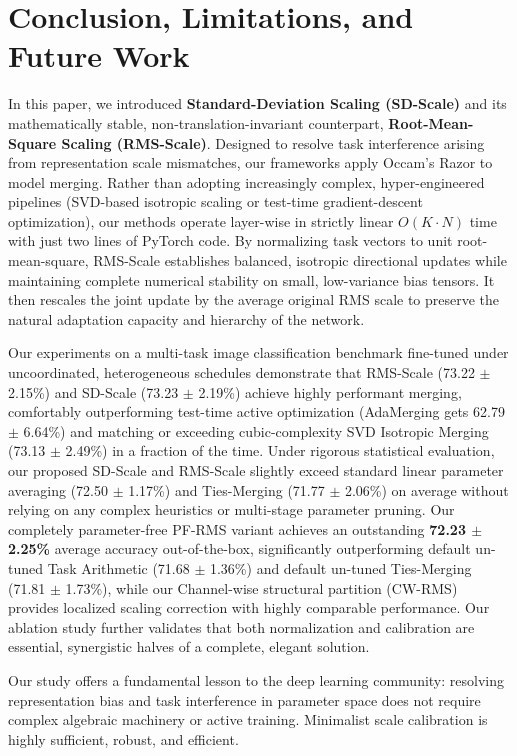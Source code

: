 \section{Conclusion, Limitations, and Future Work}
\label{submission:sec:conclusion}

In this paper, we introduced \textbf{Standard-Deviation Scaling (SD-Scale)} and its mathematically stable, non-translation-invariant counterpart, \textbf{Root-Mean-Square Scaling (RMS-Scale)}. Designed to resolve task interference arising from representation scale mismatches, our frameworks apply Occam's Razor to model merging. Rather than adopting increasingly complex, hyper-engineered pipelines (SVD-based isotropic scaling or test-time gradient-descent optimization), our methods operate layer-wise in strictly linear $O(K \cdot N)$ time with just two lines of PyTorch code. By normalizing task vectors to unit root-mean-square, RMS-Scale establishes balanced, isotropic directional updates while maintaining complete numerical stability on small, low-variance bias tensors. It then rescales the joint update by the average original RMS scale to preserve the natural adaptation capacity and hierarchy of the network.

Our experiments on a multi-task image classification benchmark fine-tuned under uncoordinated, heterogeneous schedules demonstrate that RMS-Scale (73.22 $\pm$ 2.15\%) and SD-Scale (73.23 $\pm$ 2.19\%) achieve highly performant merging, comfortably outperforming test-time active optimization (AdaMerging gets 62.79 $\pm$ 6.64\%) and matching or exceeding cubic-complexity SVD Isotropic Merging (73.13 $\pm$ 2.49\%) in a fraction of the time. Under rigorous statistical evaluation, our proposed SD-Scale and RMS-Scale slightly exceed standard linear parameter averaging (72.50 $\pm$ 1.17\%) and Ties-Merging (71.77 $\pm$ 2.06\%) on average without relying on any complex heuristics or multi-stage parameter pruning. Our completely parameter-free PF-RMS variant achieves an outstanding \textbf{72.23 $\pm$ 2.25\%} average accuracy out-of-the-box, significantly outperforming default un-tuned Task Arithmetic (71.68 $\pm$ 1.36\%) and default un-tuned Ties-Merging (71.81 $\pm$ 1.73\%), while our Channel-wise structural partition (CW-RMS) provides localized scaling correction with highly comparable performance. Our ablation study further validates that both normalization and calibration are essential, synergistic halves of a complete, elegant solution.

Our study offers a fundamental lesson to the deep learning community: resolving representation bias and task interference in parameter space does not require complex algebraic machinery or active training. Minimalist scale calibration is highly sufficient, robust, and efficient.

